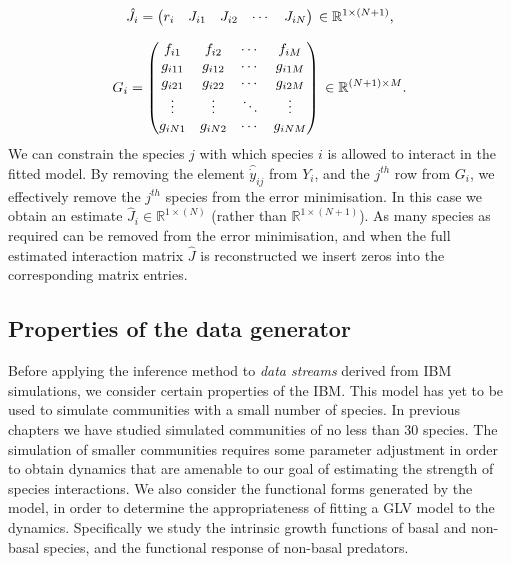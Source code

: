\begin{equation}\label{eq:timme99}
\hat{J}_{i} = 
\begin{pmatrix}
  r_i & J_{i1} & J_{i2} & \cdots & J_{iN}
\end{pmatrix}\\
\in{\mathbb{R}^{1 \times(N+1)}},
\end{equation}

\begin{equation}\label{eq:timme10}
G_{i} = 
\begin{pmatrix}
  f_{i1}  &    f_{i2} & \cdots & f_{iM}         \\
  g_{i11} & g_{i12} & \cdots & g_{i1M} \\
  g_{i21} & g_{i22} & \cdots & g_{i2M} \\
  \vdots    & \vdots    & \ddots & \vdots    \\
  g_{iN1} & g_{iN2} & \cdots & g_{iNM} \\
\end{pmatrix}\\
\in{\mathbb{R}^{(N+1)\times M}}.
\end{equation}
%
We can constrain the species $j$ with which species $i$ is allowed to interact in the fitted model. By removing the element $\hat{\dot{y}}_{ij}$ from $Y_{i}$, and the $j^{th}$ row from $G_i$, we effectively remove the $j^{th}$ species from the error minimisation. In this case we obtain an estimate $\hat{J}_{i} \in \mathbb{R}^{1 \times(N)}$ (rather than $\mathbb{R}^{1 \times(N+1)}$). As many species as required can be removed from the error minimisation, and when the full estimated interaction matrix $\hat{J}$ is reconstructed we insert zeros into the corresponding matrix entries.

\subsection{Properties of the data generator}
\label{sec:prop_ibm_gen}

Before applying the inference method to \emph{data streams} derived from IBM simulations, we consider certain properties of the IBM. This model has yet to be used to simulate communities with a small number of species. In previous chapters we have studied simulated communities of no less than 30 species. The simulation of smaller communities requires some parameter adjustment in order to obtain dynamics that are amenable to our goal of estimating the strength of species interactions. We also consider the functional forms generated by the model, in order to determine the appropriateness of fitting a GLV model to the dynamics. Specifically we study the intrinsic growth functions of basal and non-basal species, and the functional response of non-basal predators. 

